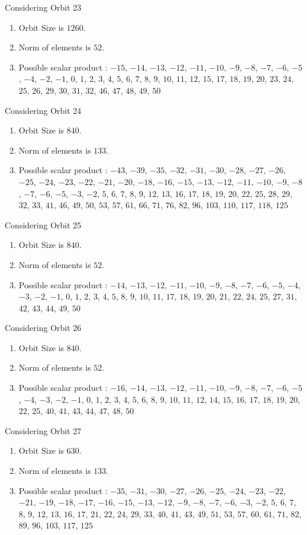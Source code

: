 \documentclass[12pt]{article}
\begin{document}
Considering Orbit 23
\begin{enumerate}
\item Orbit Size is $1260$.
\item Norm of elements is $52$.
\item Possible scalar product : $-15$, $-14$, $-13$, $-12$, $-11$, $-10$, $-9$, $-8$, $-7$, $-6$, $-5$, $-4$, $-2$, $-1$, $0$, $1$, $2$, $3$, $4$, $5$, $6$, $7$, $8$, $9$, $10$, $11$, $12$, $15$, $17$, $18$, $19$, $20$, $23$, $24$, $25$, $26$, $29$, $30$, $31$, $32$, $46$, $47$, $48$, $49$, $50$
\end{enumerate}
Considering Orbit 24
\begin{enumerate}
\item Orbit Size is $840$.
\item Norm of elements is $133$.
\item Possible scalar product : $-43$, $-39$, $-35$, $-32$, $-31$, $-30$, $-28$, $-27$, $-26$, $-25$, $-24$, $-23$, $-22$, $-21$, $-20$, $-18$, $-16$, $-15$, $-13$, $-12$, $-11$, $-10$, $-9$, $-8$, $-7$, $-6$, $-5$, $-3$, $-2$, $5$, $6$, $7$, $8$, $9$, $12$, $13$, $16$, $17$, $18$, $19$, $20$, $22$, $25$, $28$, $29$, $32$, $33$, $41$, $46$, $49$, $50$, $53$, $57$, $61$, $66$, $71$, $76$, $82$, $96$, $103$, $110$, $117$, $118$, $125$
\end{enumerate}
Considering Orbit 25
\begin{enumerate}
\item Orbit Size is $840$.
\item Norm of elements is $52$.
\item Possible scalar product : $-14$, $-13$, $-12$, $-11$, $-10$, $-9$, $-8$, $-7$, $-6$, $-5$, $-4$, $-3$, $-2$, $-1$, $0$, $1$, $2$, $3$, $4$, $5$, $8$, $9$, $10$, $11$, $17$, $18$, $19$, $20$, $21$, $22$, $24$, $25$, $27$, $31$, $42$, $43$, $44$, $49$, $50$
\end{enumerate}
Considering Orbit 26
\begin{enumerate}
\item Orbit Size is $840$.
\item Norm of elements is $52$.
\item Possible scalar product : $-16$, $-14$, $-13$, $-12$, $-11$, $-10$, $-9$, $-8$, $-7$, $-6$, $-5$, $-4$, $-3$, $-2$, $-1$, $0$, $1$, $2$, $3$, $4$, $5$, $6$, $8$, $9$, $10$, $11$, $12$, $14$, $15$, $16$, $17$, $18$, $19$, $20$, $22$, $25$, $40$, $41$, $43$, $44$, $47$, $48$, $50$
\end{enumerate}
Considering Orbit 27
\begin{enumerate}
\item Orbit Size is $630$.
\item Norm of elements is $133$.
\item Possible scalar product : $-35$, $-31$, $-30$, $-27$, $-26$, $-25$, $-24$, $-23$, $-22$, $-21$, $-19$, $-18$, $-17$, $-16$, $-15$, $-13$, $-12$, $-9$, $-8$, $-7$, $-6$, $-3$, $-2$, $5$, $6$, $7$, $8$, $9$, $12$, $13$, $16$, $17$, $21$, $22$, $24$, $29$, $33$, $40$, $41$, $43$, $49$, $51$, $53$, $57$, $60$, $61$, $71$, $82$, $89$, $96$, $103$, $117$, $125$
\end{enumerate}
\end{document}
